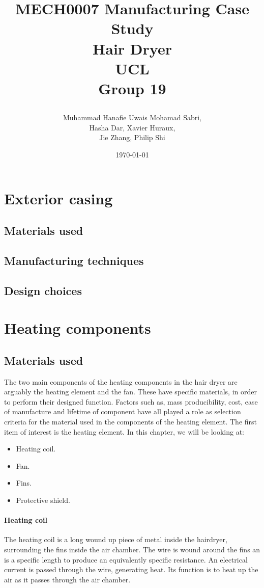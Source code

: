 \documentclass[12pt,a4paper, twoside]{report}
\begin{document}
\title{
  {MECH0007 Manufacturing Case Study}\\
  {Hair Dryer}\\
  {\large UCL}\\
  {\large Group 19}
  \author{Muhammad Hanafie Uwais Mohamad Sabri,\\Hasha Dar, Xavier Huraux,\\Jie Zhang, Philip Shi}
  \date{\today}
}
\maketitle
\tableofcontents
\chapter{Exterior casing}
\section{Materials used}
\section{Manufacturing techniques}
\section{Design choices}
\chapter{Heating components}
\section{Materials used}
The two main components of the heating components in the hair dryer are arguably the heating element and the fan. These have specific materials, in order to perform their designed function. Factors such as, mass producibility, cost, ease of manufacture and lifetime of component have all played a role as selection criteria for the material used in the components of the heating element. The first item of interest is the heating element. In this chapter, we will be looking at:
\begin{itemize}
  \item Heating coil.
  \item Fan.
  \item Fins. 
  \item Protective shield.
\end{itemize}
\subsubsection{Heating coil}
The heating coil is a long wound up piece of metal inside the hairdryer, surrounding the fins inside the air chamber. The wire is wound around the fins an is a specific length to produce an equivalently specific resistance. An electrical current is passed  through the wire, generating heat. Its function is to heat up the air as it passes through the air chamber. 
\end{document}
